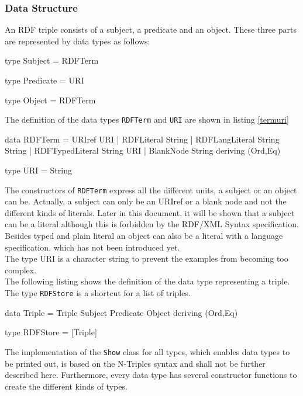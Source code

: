 \documentclass[11pt,a4paper,headsepline, bibtotoc]{scrreprt}
\begin{document}
\subsubsection{Data Structure}
An RDF triple consists of a subject, a predicate and an object. These three parts are represented by data types as follows:
\begin{code}[caption={Data Types Subject, Predicate and Object}]
type Subject = RDFTerm

type Predicate = URI

type Object = RDFTerm
\end{code}
The definition of the data types \texttt{RDFTerm} and \texttt{URI} are shown in listing \ref{termuri}
\begin{code}[caption=Types RDFTerm and URI, label=termuri]
data RDFTerm = URIref URI  
               | RDFLiteral String 
               | RDFLangLiteral String String
               | RDFTypedLiteral String URI 
               | BlankNode String
                 deriving (Ord,Eq)

type URI = String
\end{code}
The constructors of \texttt{RDFTerm} express all the different units, a subject or an object can be. Actually, a subject can only be an URIref or a blank node and not the different kinds of literals. Later in this document, it will be shown that a subject can be a literal although this is forbidden by the RDF/XML Syntax specification. Besides typed and plain literal an object can also be a literal with a language specification, which has not been introduced yet.\\
The type URI is a character string to prevent the examples from becoming too complex.\\
The following listing shows the definition of the data type representing a triple. The type \texttt{RDFStore} is a shortcut for a list of triples.
\enlargethispage{0.5cm}
\begin{code}[caption= Triple Data Type]
data Triple = Triple Subject Predicate Object 
              deriving (Ord,Eq)

type RDFStore = [Triple]
\end{code}   
The implementation of the \texttt{Show} class for all types, which enables data types to be printed out, is based on the N-Triples syntax and shall not be further described here. Furthermore, every data type has several constructor functions to create the different kinds of types.
\end{document}
